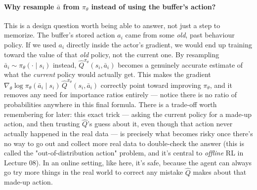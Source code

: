 \documentclass[11pt]{article}
\begin{document}
\paragraph{Why resample $\bar a$ from $\pi_\theta$ instead of using the buffer's action?} This is a design question worth being able to answer, not just a step to memorize. The buffer's stored action $a_i$ came from some \emph{old}, past behaviour policy. If we used $a_i$ directly inside the actor's gradient, we would end up training toward the value of that \emph{old} policy, not the current one. By resampling $\bar a_i \sim \pi_\theta(\cdot\mid s_i)$ instead, $\hat Q^{\pi_\theta}(s_i,\bar a_i)$ becomes a genuinely accurate estimate of what the \emph{current} policy would actually get. This makes the gradient $\nabla_\theta \log\pi_\theta(\bar a_i\mid s_i)\,\hat Q^{\pi_\theta}(s_i,\bar a_i)$ correctly point toward improving $\pi_\theta$, and it removes any need for importance ratios entirely --- notice there is no ratio of probabilities anywhere in this final formula. There is a trade-off worth remembering for later: this exact trick --- asking the current policy for a made-up action, and then trusting $\hat Q$'s guess about it, even though that action never actually happened in the real data --- is precisely what becomes risky once there's no way to go out and collect more real data to double-check the answer (this is called the "out-of-distribution action" problem, and it's central to \emph{offline} RL in Lecture 08). In an online setting, like here, it's safe, because the agent can always go try more things in the real world to correct any mistake $\hat Q$ makes about that made-up action.
\end{document}
